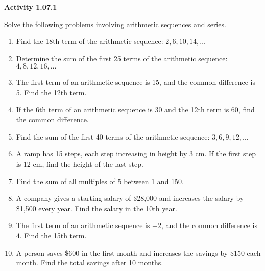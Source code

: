 \vspace{0.3ex}
\noindent\textbf{Activity 1.07.1}

\vspace{0.2ex}

Solve the following problems involving arithmetic sequences and series.
\begin{enumerate}
    \item Find the 18th term of the arithmetic sequence: \(2, 6, 10, 14, \dots\)
    \item Determine the sum of the first 25 terms of the arithmetic sequence: \(4, 8, 12, 16, \dots\)
    \item The first term of an arithmetic sequence is 15, and the common difference is 5. Find the 12th term.
    \item If the 6th term of an arithmetic sequence is 30 and the 12th term is 60, find the common difference.
    \item Find the sum of the first 40 terms of the arithmetic sequence: \(3, 6, 9, 12, \dots\)
    \item A ramp has 15 steps, each step increasing in height by 3 cm. If the first step is 12 cm, find the height of the last step.
    \item Find the sum of all multiples of 5 between 1 and 150.
    \item A company gives a starting salary of \$28,000 and increases the salary by \$1,500 every year. Find the salary in the 10th year.
    \item The first term of an arithmetic sequence is \( -2 \), and the common difference is \( 4 \). Find the 15th term.
    \item A person saves \$600 in the first month and increases the savings by \$150 each month. Find the total savings after 10 months.
\end{enumerate}
